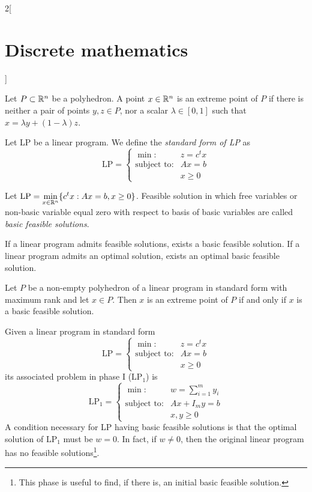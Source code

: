 \documentclass[../../../main.tex]{subfiles}
\begin{document}
\begin{multicols}{2}[\section{Discrete mathematics}]
\begin{definition}
\end{definition}
\begin{definition}
Let $P\subset\mathbb{R} ^n$ be a polyhedron. A point $x\in\mathbb{R} ^n$ is an extreme point of $P$ if there is neither a pair of points $y,z\in P$, nor a scalar $\lambda\in[0,1]$ such that $x=\lambda y+(1-\lambda)z$.
\end{definition}
\begin{definition}
Let LP be a linear program. We define the \textit{standard form of LP} as $$\text{LP}=\left\{\begin{array}{rc}
    \min: & z=c^tx \\
    \text{subject to}: & Ax=b\\
     & x\geq 0
    \end{array}\right.$$
\end{definition}
\begin{definition}
Let $\displaystyle \text{LP}=\min_{x\in\mathbb{R} ^n}\{c^tx:Ax=b,x\geq 0\}$. Feasible solution in which free variables or non-basic variable equal zero with respect to basis of basic variables are called \textit{basic feasible solutions}.
\end{definition}
\begin{prop}
If a linear program admits feasible solutions, exists a basic feasible solution. If a linear program admits an optimal solution, exists an optimal basic feasible solution.
\end{prop}
\begin{theorem}
Let $P$ be a non-empty polyhedron of a linear program in standard form with maximum rank and let $x\in P$. Then $x$ is an extreme point of $P$ if and only if $x$ is a basic feasible solution.
\end{theorem}
\begin{definition}
Given a linear program in standard form $$\text{LP}=\left\{\begin{array}{rc}
    \min: & z=c^tx \\
    \text{subject to}: & Ax=b\\
     & x\geq 0
    \end{array}\right.$$ its associated problem in phase I ($\text{LP}_1$) is $$\text{LP}_1=\left\{\begin{array}{rc}
    \min: & \displaystyle w=\sum_{i=1}^my_i \\
    \text{subject to}: & Ax+I_my=b\\
     & x,y\geq 0
    \end{array}\right.$$
    A condition necessary for LP having basic feasible solutions is that the optimal solution of $\text{LP}_1$ must be $w=0$. In fact, if $w\ne 0$, then the original linear program has no feasible solutions\footnote{This phase is useful to find, if there is, an initial basic feasible solution.}.

\end{definition}
\end{multicols}
\end{document}
